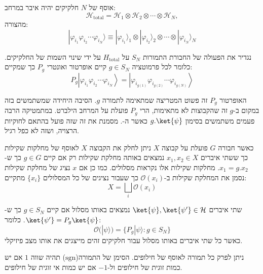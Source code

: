 \documentclass{tstextbook}
\begin{document}
\begin{reminder}
אוסף של \(N\) חלקיקים יהיה איבר במרחב:
$${\mathcal{H}}_{\mathrm{total}}={\mathcal{H}}_{1}\otimes{\mathcal{H}}_{2}\otimes\cdots\otimes{\mathcal{H}}_{N},$$
מהצורה:
$$|\varphi_{i_{1}}\varphi_{i_{2}}\cdots\varphi_{i_{N}}\rangle\equiv|\varphi_{i_{1}}\rangle_{1}\otimes|\varphi_{i_{2}}\rangle_{2}\otimes\cdots\otimes|\varphi_{i_{N}}\rangle_{N}$$

\end{reminder}
\begin{definition}
נגדיר את הפעולה של החבורת התמורות \(S_{N}\) על \(H_{\text{total}}\) על ידי שינוי השמות של החלקיקים. כלומר לכל פרמוטציה \(g \in S_{N}\) קיים אופרטור ואונטרי \(P_{g}\) כך שמקיים:
$$P_{g}\left|\varphi_{i_{1}}\varphi_{i_{2}}\cdots\varphi_{i_{N}}\right\rangle=\left|\varphi_{i_{g(1)}}\varphi_{i_{g(2)}}\cdots\varphi_{i_{g(N)}}\right\rangle$$

\end{definition}
\begin{remark}
האופרטור \(P_{g}\) זה פשוט המטריצה שמתאימה לתמורה \(g\). הסיבה היחידה שמשתמשים בזה במקום ב-\(g\) זה שהקבוצות לא מתאימות, הרי \(P_{g}\) פועלת על המרחב הילברט. במתמטיקה הרבה פעמים משתמשים בסימון \(g.\ket{\psi}\) כאשר ה-. מסמנת את זה שזה פועל בהתאם לחוקיות הרצויה, ושזה לא כפל רגיל.

\end{remark}
\begin{reminder}
כאשר חבורה \(G\) פועלת על קבוצה \(X\) ניתן לחלק את הקבוצה \(X\) לאוסף של מחלקות שקילות כך ששתי איברים \(x_{1},x_{2} \in X\) נמצאים באותה מחלקת שקילות רק אם קיים \(g \in G\) כך ש-\(x_{1}=g.x_{2}\). מחלקות שקילות אלו נקראות מסלולים. כמו כן אם \(x\) נציג של מחלקת שקילות נסמן את המחלקת שקילות ב-\(\mathcal{O}(x_{i})\) כך שעבור נציגים של כל המסלולים \(\{ x_{i} \}\) מתקיים:
$$X=\bigsqcup_{i} \mathcal{O} (x_{i})$$

\end{reminder}
\begin{corollary}
שתי איברים \(\ket{\psi},\ket{\psi '}\in \mathcal{H}\) נמצאים באותו מסלול אם קיים \(g \in S_{N}\) כך ש-\(\ket{\psi'}=P_{g}\ket{\psi}\). כלומר:
$${\mathcal{O}}(|\psi\rangle)=\{P_{g}|\psi\rangle:g\in S_{N}\}$$
כאשר כל שתי איברים באותו מסלול עבור חלקיקים זהים מייצגים את אותו מצב פיזיקלי.

\end{corollary}
\begin{reminder}
ניתן לפרק כל תמורה לאוסף של חילופים. הסימן של התמורה(\(\mathrm{sgn}\)) תהיה שווה \(1\) אם יש כמות זוגית של חילופים ול-\(-1\) אם יש כמות אי זוגית של חילופים.

\end{reminder}
\end{document}
